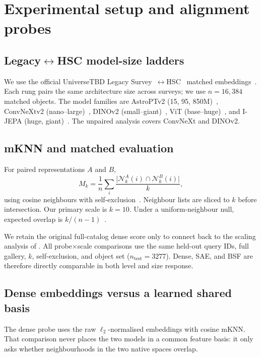 \documentclass[11pt]{article}
\begin{document}
\section{Experimental setup and alignment probes}
\label{sec:setup}

\subsection{Legacy\(\leftrightarrow\)HSC model-size ladders}

We use the official UniverseTBD Legacy Survey~\citep{dey2019legacy}\(\leftrightarrow\)HSC~\citep{miyazaki2018hsc} matched embeddings~\citep{duraphe2025platonicuniverse}.
Each rung pairs the same architecture size across surveys; we use \(n{=}16{,}384\) matched objects.
The model families are AstroPTv2 (15, 95, 850M)~\citep{smith2024astropt},
ConvNeXtv2 (nano--large)~\citep{woo2023convnextv2},
DINOv2 (small--giant)~\citep{oquab2024dinov2},
ViT (base--huge)~\citep{dosovitskiy2021vit},
and I-JEPA (huge, giant)~\citep{assran2023ijepa}.
The unpaired analysis covers ConvNeXt and DINOv2.

\subsection{mKNN and matched evaluation}

For paired representations \(A\) and \(B\),
\[
M_k=\frac{1}{n}\sum_i
\frac{\lvert \mathcal N_k^A(i)\cap \mathcal N_k^B(i)\rvert}{k},
\]
using cosine neighbours with self-exclusion~\citep{huh2024platonic,duraphe2025platonicuniverse}.
Neighbour lists are sliced to \(k\) before intersection.
Our primary scale is \(k{=}10\).
Under a uniform-neighbour null, expected overlap is \(k/(n{-}1)\)~\citep{groger2026aristotelian}.

We retain the original full-catalog dense score only to connect back to the scaling analysis of \citet{duraphe2025platonicuniverse}.
All probe\(\times\)scale comparisons use the same held-out query IDs, full gallery, \(k\), self-exclusion, and object set (\(n_{\mathrm{test}}{=}3277\)).
Dense, SAE, and BSF are therefore directly comparable in both level and size response.

\subsection{Dense embeddings versus a learned shared basis}

The dense probe uses the raw \(\ell_2\)-normalised embeddings with cosine mKNN.
That comparison never places the two models in a common feature basis: it only asks whether neighbourhoods in the two native spaces overlap.
\end{document}
